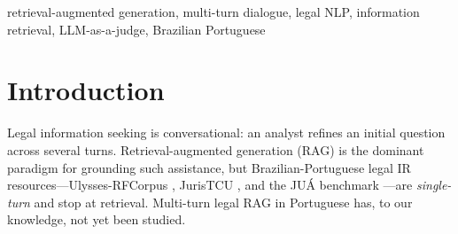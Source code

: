 \documentclass[conference]{IEEEtran}
\begin{document}
\begin{IEEEkeywords}
retrieval-augmented generation, multi-turn dialogue, legal NLP, information
retrieval, LLM-as-a-judge, Brazilian Portuguese
\end{IEEEkeywords}

\section{Introduction}
Legal information seeking is conversational: an analyst refines an initial
question across several turns. Retrieval-augmented generation (RAG)
\cite{Lewis2020RAG} is the dominant paradigm for grounding such assistance, but
Brazilian-Portuguese legal IR resources---Ulysses-RFCorpus \cite{Vitorio2024},
JurisTCU \cite{Fernandes2026JurisTCU}, and the JU\'A benchmark
\cite{Pereira2026JUA}---are \emph{single-turn} and stop at retrieval. Multi-turn
legal RAG in Portuguese has, to our knowledge, not yet been studied.
\end{document}
